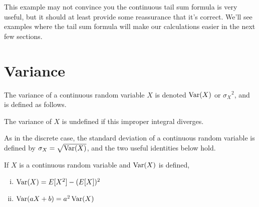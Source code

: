 This example may not convince you the continuous tail sum formula is very useful, but it should at least provide some reassurance that it's correct. We'll see examples where the tail sum formula will make our calculations easier in the next few sections.


\section{Variance}\label{ContinuousVarianceSec}

\begin{defn}The variance of a continuous random variable $X$ is denoted $\operatorname{Var}(X)$ or ${\sigma_X}^2$, and is defined as follows.
\par
\noindent The variance of $X$ is undefined if this improper integral diverges.
\end{defn}
\par
As in the discrete case, the standard deviation of a continuous random variable is defined by $\sigma_X = \sqrt{\operatorname{Var}(X)}$, and the two useful identities below hold. 

\begin{prop}If $X$ is a continuous random variable and $\operatorname{Var}(X)$ is defined,
\begin{enumerate}[(i)]
\item $\operatorname{Var}(X) = E[X^2] -(E[X])^2$
\item $\operatorname{Var}(aX+b) = a^2\operatorname{Var}(X)$
\end{enumerate}
\end{prop}

